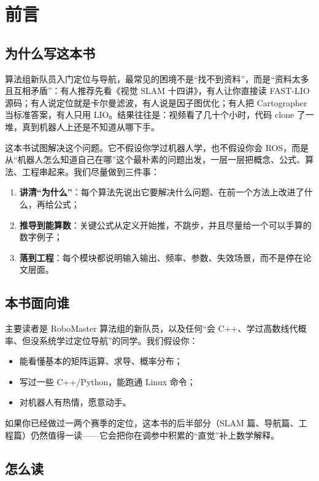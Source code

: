 \chapter{前言}

\section*{为什么写这本书}

算法组新队员入门定位与导航，最常见的困境不是“找不到资料”，而是“资料太多且互相矛盾”：有人推荐先看《视觉 SLAM 十四讲》，有人让你直接读 FAST-LIO 源码；有人说定位就是卡尔曼滤波，有人说是因子图优化；有人把 Cartographer 当标准答案，有人只用 LIO。结果往往是：视频看了几十个小时，代码 clone 了一堆，真到机器人上还是不知道从哪下手。

这本书试图解决这个问题。它不假设你学过机器人学，也不假设你会 ROS，而是从“机器人怎么知道自己在哪”这个最朴素的问题出发，一层一层把概念、公式、算法、工程串起来。我们尽量做到三件事：
\begin{enumerate}
  \item \textbf{讲清“为什么”}：每个算法先说出它要解决什么问题、在前一个方法上改进了什么，再给公式；
  \item \textbf{推导到能算数}：关键公式从定义开始推，不跳步，并且尽量给一个可以手算的数字例子；
  \item \textbf{落到工程}：每个模块都说明输入输出、频率、参数、失效场景，而不是停在论文层面。
\end{enumerate}

\section*{本书面向谁}

主要读者是 RoboMaster 算法组的新队员，以及任何“会 C++、学过高数线代概率、但没系统学过定位导航”的同学。我们假设你：
\begin{itemize}
  \item 能看懂基本的矩阵运算、求导、概率分布；
  \item 写过一些 C++/Python，能跑通 Linux 命令；
  \item 对机器人有热情，愿意动手。
\end{itemize}
如果你已经做过一两个赛季的定位，这本书的后半部分（SLAM 篇、导航篇、工程篇）仍然值得一读——它会把你在调参中积累的“直觉”补上数学解释。

\section*{怎么读}

